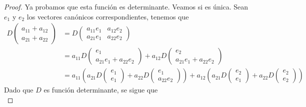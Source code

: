 \documentclass[12pt,a4paper]{book}
\newcommand{\parentesis}[1]{\left(#1\right)}
\begin{document}
    \begin{proof}
        Ya probamos que esta función es determinante. Veamos si es única. Sean $e_{1}$ y $e_{2}$ los vectores canónicos correspondientes, tenemos que
        \begin{align*}
            D
            \begin{pmatrix}
                a_{11} + a_{12}\\
                a_{21} + a_{22}
            \end{pmatrix} & = D
            \begin{pmatrix}
                a_{11}e_{1} & a_{12}e_{2}\\
                a_{21}e_{1} & a_{22}e_{2}
            \end{pmatrix}\\
            & = a_{11}D
            \begin{pmatrix}
                e_{1}\\
                a_{21}e_{1}+a_{22}e_{2}
            \end{pmatrix}
            + a_{12}D
            \begin{pmatrix}
                e_{2}\\
                a_{21}e_{1}+a_{22}e_{2}
            \end{pmatrix}\\
            &=a_{11}\parentesis{
                a_{21}D
                \begin{pmatrix}
                    e_{1}\\
                    e_{1}
                \end{pmatrix}
                +a_{22}D
                \begin{pmatrix}
                   e_{1}\\
                   a_{22}e_{2}
                \end{pmatrix}
                }
             + a_{12} \parentesis{a_{21}D\begin{pmatrix}
                e_{2}\\e_{1}
            \end{pmatrix}
             + a_{22}D \begin{pmatrix}
                 e_{2}\\e_{2}
             \end{pmatrix}
             } \tag{4.1.1} \label{4.1.1}
        \end{align*}
        Dado que $D$ es función determinante, se sigue que
        \begin{equation*}

\end{equation*}
\end{proof}
\end{document}
